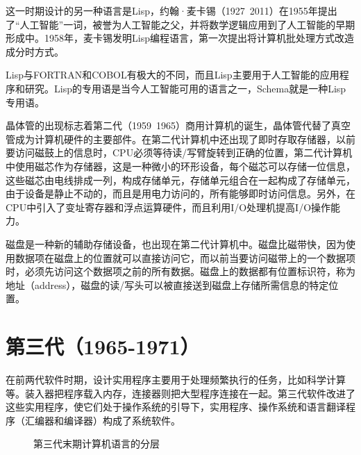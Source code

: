 这一时期设计的另一种语言是Lisp，约翰·麦卡锡（1927~2011）在1955年提出了“人工智能”一词，被誉为人工智能之父，并将数学逻辑应用到了人工智能的早期形成中。1958年，麦卡锡发明Lisp编程语言，第一次提出将计算机批处理方式改造成分时方式。

Lisp与FORTRAN和COBOL有极大的不同，而且Lisp主要用于人工智能的应用程序和研究。Lisp的专用语是当今人工智能可用的语言之一，Schema就是一种Lisp专用语。

晶体管的出现标志着第二代（1959~1965）商用计算机的诞生，晶体管代替了真空管成为计算机硬件的主要部件。在第二代计算机中还出现了即时存取存储器，以前要访问磁鼓上的信息时，CPU必须等待读/写臂旋转到正确的位置，第二代计算机中使用磁芯作为存储器，这是一种微小的环形设备，每个磁芯可以存储一位信息，这些磁芯由电线排成一列，构成存储单元，存储单元组合在一起构成了存储单元，由于设备是静止不动的，而且是用电力访问的，所有能够即时访问信息。另外，在CPU中引入了变址寄存器和浮点运算硬件，而且利用I/O处理机提高I/O操作能力。

磁盘是一种新的辅助存储设备，也出现在第二代计算机中。磁盘比磁带快，因为使用数据项在磁盘上的位置就可以直接访问它，而以前当要访问磁带上的一个数据项时，必须先访问这个数据项之前的所有数据。磁盘上的数据都有位置标识符，称为地址（address），磁盘的读/写头可以被直接送到磁盘上存储所需信息的特定位置。

\section{第三代（1965-1971）}

在前两代软件时期，设计实用程序主要用于处理频繁执行的任务，比如科学计算等。装入器把程序载入内存，连接器则把大型程序连接在一起。第三代软件改进了这些实用程序，使它们处于操作系统的引导下，实用程序、操作系统和语言翻译程序（汇编器和编译器）构成了系统软件。


\begin{figure}[!h]
\centering
\caption{第三代末期计算机语言的分层}
\end{figure}



